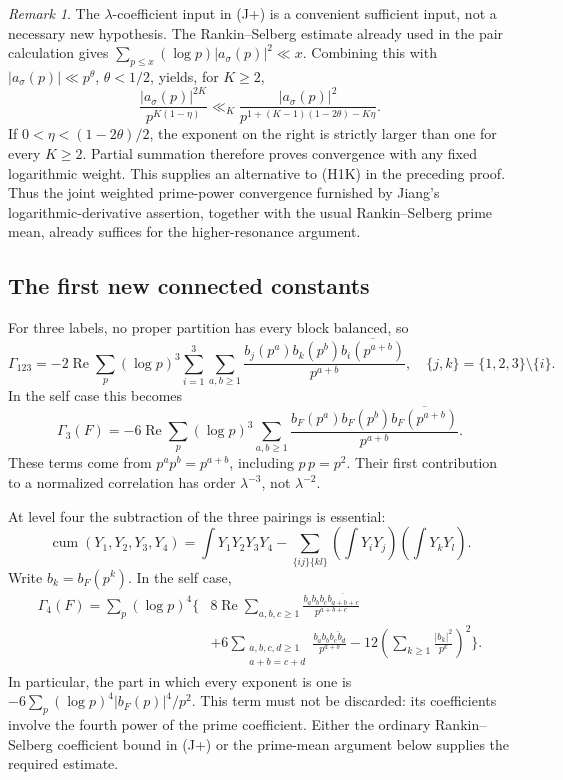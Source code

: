 \documentclass[11pt]{article}
\numberwithin{equation}{section}
\theoremstyle{remark}
\newtheorem{remark}[theorem]{Remark}
\begin{document}
\begin{remark}
The $\lambda$-coefficient input in (J+) is a convenient sufficient input,
not a necessary new hypothesis.  The Rankin--Selberg estimate already used
in the pair calculation gives
$\sum_{p\le x}(\log p)|a_\sigma(p)|^2\ll x$.
Combining this with $|a_\sigma(p)|\ll p^\theta$, $\theta<1/2$, yields,
for $K\ge2$,
\[
 \frac{|a_\sigma(p)|^{2K}}{p^{K(1-\eta)}}
 \ll_K\frac{|a_\sigma(p)|^2}
 {p^{1+(K-1)(1-2\theta)-K\eta}}.
\]
If $0<\eta<(1-2\theta)/2$, the exponent on the right is strictly
larger than one for every $K\ge2$.  Partial summation therefore proves
convergence with any fixed logarithmic weight.  This supplies an
alternative to (H1K) in the preceding proof.  Thus the joint weighted
prime-power convergence furnished by Jiang's logarithmic-derivative
assertion, together with the usual Rankin--Selberg prime mean, already
suffices for the higher-resonance argument.
\end{remark}

\subsection{The first new connected constants}
For three labels, no proper partition has every block balanced, so
\[
 \Gamma_{123}=-2\operatorname{Re}\sum_p(\log p)^3
 \sum_{i=1}^3\sum_{a,b\ge1}
 \frac{b_j(p^a)b_k(p^b)\overline{b_i(p^{a+b})}}{p^{a+b}},
 \quad\{j,k\}=\{1,2,3\}\setminus\{i\}.
\]
In the self case this becomes
\[
 \Gamma_3(F)=-6\operatorname{Re}\sum_p(\log p)^3
       \sum_{a,b\ge1}\frac{b_F(p^a)b_F(p^b)
           \overline{b_F(p^{a+b})}}{p^{a+b}}.
\]
These terms come from $p^ap^b=p^{a+b}$, including $p\,p=p^2$.
Their first contribution to a normalized correlation has order
$\lambda^{-3}$, not $\lambda^{-2}$.

At level four the subtraction of the three pairings is essential:
\[
 \operatorname{cum}(Y_1,Y_2,Y_3,Y_4)
 =\int Y_1Y_2Y_3Y_4
  -\sum_{\{ij\}\{kl\}}\left(\int Y_iY_j\right)
                         \left(\int Y_kY_l\right).
\]
Write $b_k=b_F(p^k)$.  In the self case,
\begin{align*}
 \Gamma_4(F)=\sum_p(\log p)^4\bigg\{
 &8\operatorname{Re}\sum_{a,b,c\ge1}
       \frac{b_ab_bb_c\overline{b_{a+b+c}}}{p^{a+b+c}}\\
 &+6\sum_{\substack{a,b,c,d\ge1\\a+b=c+d}}
       \frac{b_ab_b\overline{b_c b_d}}{p^{a+b}}
 -12\left(\sum_{k\ge1}\frac{|b_k|^2}{p^k}\right)^2\bigg\}.
\end{align*}
In particular, the part in which every exponent is one is
$-6\sum_p(\log p)^4|b_F(p)|^4/p^2$.
This term must not be discarded: its coefficients involve the fourth
power of the prime coefficient.  Either the ordinary Rankin--Selberg
coefficient bound in (J+) or the prime-mean argument below supplies the
required estimate.
\end{document}
